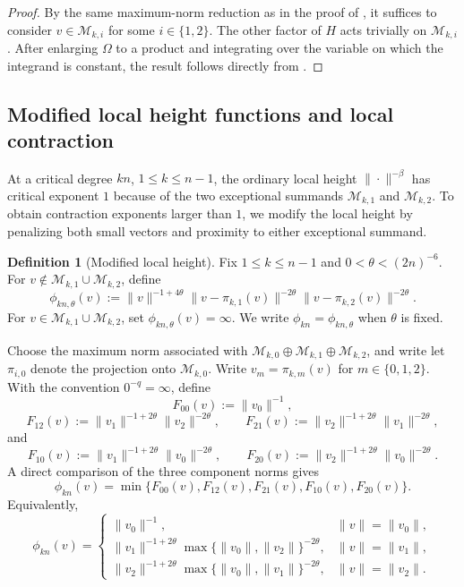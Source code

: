 \documentclass[reqno,11pt]{amsart}
\numberwithin{equation}{section}
\theoremstyle{definition}
\newtheorem{definition}[theorem]{Definition}
\theoremstyle{remark}
\begin{document}
\begin{proof}
By the same maximum-norm reduction as in the proof of
, it suffices to consider $v\in\mathcal M_{k,i}$ for some $i\in\{1,2\}$. The other factor of $H$
acts trivially on $\mathcal M_{k,i}$. After enlarging $\Omega$ to a
product and integrating over the variable on which the integrand is constant, the result follows
directly from .
\end{proof}

\subsection{Modified local height functions and local contraction}
\label{s:modifiedlocalheight}
At a critical degree $kn$, $1\le k\le n-1$, the ordinary local height $\|\cdot\|^{-\beta}$ has critical exponent
$1$ because of the two exceptional summands
$\mathcal M_{k,1}$ and $\mathcal M_{k,2}$. To obtain contraction exponents larger than $1$, we modify the local height by penalizing both small vectors and proximity to either exceptional summand.

\begin{definition}[Modified local height]
\label{modifiedlocalheight}
Fix $1\le k\le n-1$ and $0<\theta<(2n)^{-6}$. For
$v\notin\mathcal M_{k,1}\cup\mathcal M_{k,2}$, define
$$
\phi_{kn,\theta}(v)
:=
\|v\|^{-1+4\theta}
\|v-\pi_{k,1}(v)\|^{-2\theta}
\|v-\pi_{k,2}(v)\|^{-2\theta}.
$$
For $v\in\mathcal M_{k,1}\cup\mathcal M_{k,2}$, set
$\phi_{kn,\theta}(v)=\infty$. We write $\phi_{kn}=\phi_{kn,\theta}$
when $\theta$ is fixed.
\end{definition} Choose the maximum norm associated with
$\mathcal M_{k,0}\oplus\mathcal M_{k,1}\oplus\mathcal M_{k,2}$, and
write let $\pi_{i, 0}$ denote the projection onto $\mathcal M_{k,0}$. Write $v_m=\pi_{k,m}(v)$ for $m\in \{0,1,2\}$. With the convention $0^{-q}=\infty$, define
$$
F_{00}(v):=\|v_0\|^{-1},
$$
$$
F_{12}(v):=\|v_1\|^{-1+2\theta}\|v_2\|^{-2\theta},
\qquad
F_{21}(v):=\|v_2\|^{-1+2\theta}\|v_1\|^{-2\theta},
$$
and
$$
F_{10}(v):=\|v_1\|^{-1+2\theta}\|v_0\|^{-2\theta},
\qquad
F_{20}(v):=\|v_2\|^{-1+2\theta}\|v_0\|^{-2\theta}.
$$
A direct comparison of the three component norms gives
\begin{equation}
\label{eq:phi-as-minimum}
\phi_{kn}(v)
=
\min\{F_{00}(v),F_{12}(v),F_{21}(v),F_{10}(v),F_{20}(v)\}.
\end{equation}
Equivalently,
$$
\phi_{kn}(v)=
\begin{cases}
\|v_0\|^{-1},&\|v\|=\|v_0\|,\\
\|v_1\|^{-1+2\theta}
\max\{\|v_0\|,\|v_2\|\}^{-2\theta},
&\|v\|=\|v_1\|,\\ 
\|v_2\|^{-1+2\theta}
\max\{\|v_0\|,\|v_1\|\}^{-2\theta},
&\|v\|=\|v_2\|.
\end{cases}
$$
\end{document}
